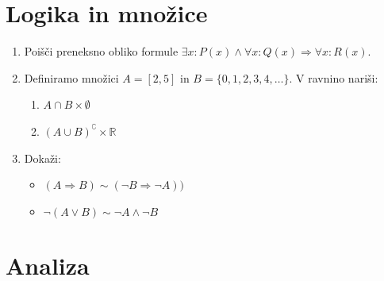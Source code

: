 \documentclass[a4paper,12pt]{article}
\begin{document}

\section*{Logika in množice}

\begin{enumerate}
\item
Poišči preneksno obliko formule \(\exists x : P(x) \land \forall x : Q(x) \Rightarrow \forall x : R(x)\).

\item
Definiramo množici \(A = [2, 5]\) in \(B = \{0, 1, 2, 3, 4, \ldots\}\).
V ravnino nariši:
\begin{enumerate}
\item \(A \cap B \times \emptyset\)
\item \((A \cup B)^{\complement} \times \mathbb{R}\)
\end{enumerate}

\item
Dokaži:
\begin{itemize}
\item \((A \Rightarrow B) \sim (\neg B \Rightarrow \neg A))\)
\item \(\neg (A \lor B) \sim \neg A \land \neg B\)
\end{itemize}
\end{enumerate}

\section*{Analiza}
\end{document}
